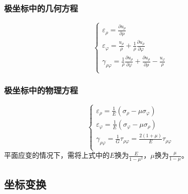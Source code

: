 \subsubsection{极坐标中的几何方程}
\begin{equation}
\begin{cases}
\varepsilon _{\rho}=\frac{\partial u_{\rho}}{\partial \rho}\\
\varepsilon _{\varphi}=\frac{u_{\rho}}{\rho}+\frac{1}{\rho}\frac{\partial u_{\rho}}{\partial \varphi}\\
\gamma _{\rho \varphi}=\frac{1}{\rho}\frac{\partial u_{\rho}}{\partial \varphi}+\frac{\partial u_{\rho}}{\partial \rho}-\frac{u_{\varphi}}{\rho}\\
\end{cases}
\end{equation}
\subsubsection{极坐标中的物理方程}
\begin{equation}
\begin{cases}
\varepsilon _{\rho}=\frac{1}{E}\left( \sigma _{\rho}-\mu \sigma _{\varphi} \right)\\
\varepsilon _{\varphi}=\frac{1}{E}\left( \sigma _{\varphi}-\mu \sigma _{\rho} \right)\\
\gamma _{\rho \varphi}=\frac{1}{G}\tau _{\rho \varphi}=\frac{2\left( 1+\mu \right)}{E}\tau _{\rho \varphi}\\
\end{cases}
\end{equation}
平面应变的情况下，需将上式中的$E$换为$\frac{E}{1-\mu ^2}$，$\mu$换为$\frac{\mu}{1-\mu}$。

\subsection{坐标变换}
